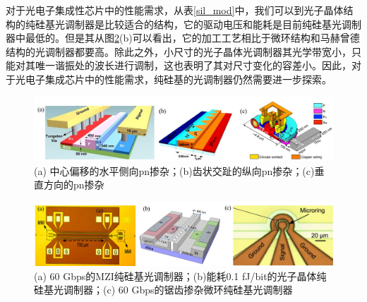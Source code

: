 对于光电子集成性芯片中的性能需求，从表\ref{sil_mod}中，我们可以到光子晶体结构的纯硅基光调制器是比较适合的结构，它的驱动电压和能耗是目前纯硅基光调制器中最低的。但是其从图\ref{fig_silicon_mod}(b)可以看出，它的加工工艺相比于微环结构和马赫曾德结构的光调制器都要高。除此之外，小尺寸的光子晶体光调制器其光学带宽小，只能对其唯一谐振处的波长进行调制，这也表明了其对尺寸变化的容差小。因此，对于光电子集成芯片中的性能需求，纯硅基的光调制器仍然需要进一步探索。

\begin{figure}[htb]
	\centering
	\includegraphics[width=15cm]{./Pictures/fig_silicon_mod_cross.jpg}
	\caption{ (a) 中心偏移的水平侧向pn掺杂\cite{xiao2013high}；(b)齿状交趾的纵向pn掺杂\cite{Xiao201360}；(c)垂直方向的pn掺杂\cite{timurdogan2014ultralow}}
	\label{fig_silicon_mod_cross}
\end{figure}

\begin{figure}[htb]
	\centering
	\includegraphics[width=15cm]{./Pictures/fig_silicon_mod.jpg}
	\caption{ (a) 60 Gbps的MZI纯硅基光调制器\cite{Xiao201360}；(b)能耗0.1 fJ/bit的光子晶体纯硅基光调制器\cite{shakoor2014ultra}；(c) 60 Gbps的锯齿掺杂微环纯硅基光调制器\cite{Xiao201360}}
	\label{fig_silicon_mod}
\end{figure}
